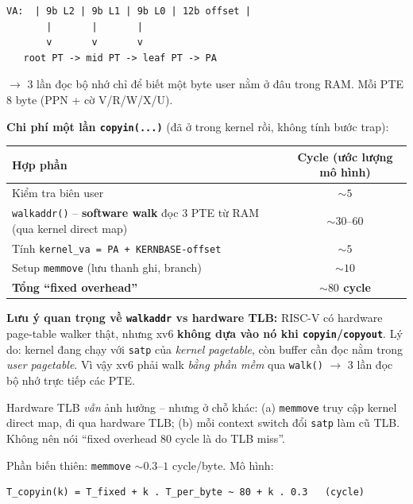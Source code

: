 \documentclass[11pt,a4paper]{article}
\begin{document}
\begin{lstlisting}[style=plain]
VA:  | 9b L2 | 9b L1 | 9b L0 | 12b offset |
       |       |       |
       v       v       v
   root PT -> mid PT -> leaf PT -> PA
\end{lstlisting}

$\rightarrow$ 3 lần đọc bộ nhớ chỉ để biết một byte user nằm ở đâu trong RAM. Mỗi PTE 8 byte (PPN + cờ V/R/W/X/U).

\textbf{Chi phí một lần \texttt{copyin(...)}} (đã ở trong kernel rồi, không tính bước trap):

\begin{center}
\begin{tabularx}{0.95\linewidth}{Xc}
\toprule
\textbf{Hợp phần} & \textbf{Cycle (ước lượng mô hình)} \\
\midrule
Kiểm tra biên user & $\sim 5$ \\
\texttt{walkaddr()} -- \textbf{software walk} đọc 3 PTE từ RAM (qua kernel direct map) & $\sim 30$--$60$ \\
Tính \texttt{kernel\_va = PA + KERNBASE-offset} & $\sim 5$ \\
Setup \texttt{memmove} (lưu thanh ghi, branch) & $\sim 10$ \\
\midrule
\textbf{Tổng ``fixed overhead''} & \textbf{$\sim 80$ cycle} \\
\bottomrule
\end{tabularx}
\end{center}

\begin{warnbox}
\textbf{Lưu ý quan trọng về \texttt{walkaddr} vs hardware TLB:} RISC-V có hardware page-table walker thật, nhưng xv6 \textbf{không dựa vào nó khi \texttt{copyin}/\texttt{copyout}}. Lý do: kernel đang chạy với \texttt{satp} của \emph{kernel pagetable}, còn buffer cần đọc nằm trong \emph{user pagetable}. Vì vậy xv6 phải walk \emph{bằng phần mềm} qua \texttt{walk()} $\rightarrow$ 3 lần đọc bộ nhớ trực tiếp các PTE.

Hardware TLB \emph{vẫn} ảnh hưởng -- nhưng ở chỗ khác: (a) \texttt{memmove} truy cập kernel direct map, đi qua hardware TLB; (b) mỗi context switch đổi \texttt{satp} làm cũ TLB. Không nên nói ``fixed overhead 80 cycle là do TLB miss''.
\end{warnbox}

Phần biến thiên: \texttt{memmove} $\sim 0.3$--$1$ cycle/byte. Mô hình:

\begin{lstlisting}[style=plain]
T_copyin(k) = T_fixed + k . T_per_byte ~ 80 + k . 0.3   (cycle)
\end{lstlisting}
\end{document}
